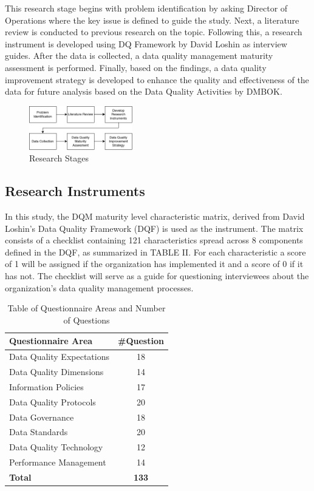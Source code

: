 \documentclass[conference]{IEEEtran}
\begin{document}
This research stage begins with problem identification by asking Director of Operations where the key issue is defined to guide the study. Next, a literature review is conducted to previous research on the topic. Following this, a research instrument is developed using DQ Framework by David Loshin \cite{loshin_dqi} as interview guides. After the data is collected, a data quality management maturity assessment is performed. Finally, based on the findings, a data quality improvement strategy is developed to enhance the quality and effectiveness of the data for future analysis based on the Data Quality Activities by DMBOK.
\begin{figure}[H]
\centerline{\includegraphics[width=0.4\textwidth]{figures/AlurPenelitian.png}}
\caption{Research Stages}
\label{fig:untuk di ref di dokumen}
\end{figure}

\subsection{Research Instruments}

In this study, the DQM maturity level characteristic matrix, derived from David Loshin’s Data Quality Framework (DQF) \cite{loshin_dqi} is used as the instrument. The matrix consists of a checklist containing 121 characteristics spread across 8 components defined in the DQF, as summarized in TABLE II. For each characteristic a score of 1 will be assigned if the organization has implemented it and a score of 0 if it has not. The checklist will serve as a guide for questioning interviewees about the organization’s data quality management processes. 
\begin{table}[H]
\caption{Table of Questionnaire Areas and Number of Questions}
\label{tab:questionnare-areas}
\centering
\begin{tabular}{|l|c|}
\hline
\textbf{Questionnaire Area} & \textbf{\#Question} \\
\hline
Data Quality Expectations & 18 \\
\hline
Data Quality Dimensions & 14 \\
\hline
Information Policies & 17 \\
\hline
Data Quality Protocols & 20 \\
\hline
Data Governance & 18 \\
\hline
Data Standards & 20 \\
\hline
Data Quality Technology & 12 \\
\hline
Performance Management & 14 \\
\hline
\textbf{Total} & \textbf{133} \\
\hline
\end{tabular}
\end{table}
\end{document}
